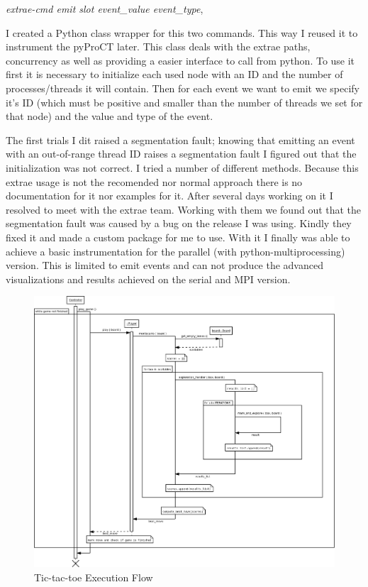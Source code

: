 \textit{extrae-cmd emit slot event\_value event\_type}, 

I created a Python class wrapper for this two commands. This way I reused it to instrument the pyProCT later. This class deals with the extrae paths, concurrency as well as providing a easier interface to call from python. To use it first it is necessary to initialize each used node with an ID and the number of processes/threads it will contain. Then for each event we want to emit we specify it's ID (which must be positive and smaller than the number of threads we set for that node) and the value and type of the event. 

The first trials I dit raised a segmentation fault; knowing that emitting an event with an out-of-range thread ID raises a segmentation fault I figured out that the initialization was not correct. I tried a number of different methods. Because this extrae usage is not the recomended nor normal approach there is no documentation for it nor examples for it. After several days working on it I resolved to meet with the extrae team. Working with them we found out that the segmentation fault was caused by a bug on the release I was using. Kindly they fixed it and made a custom package for me to use. With it I finally was able to achieve a basic instrumentation for the parallel (with python-multiprocessing) version. This is limited to emit events and can not produce the advanced visualizations and results achieved on the serial and MPI version.

\begin{landscape}
\begin{figure}
\includegraphics[width=20cm]{img/tic-tac-toe.png}
\caption{Tic-tac-toe Execution Flow}
\label{fig:tic-tac-toe}
\end{figure}
\end{landscape}


